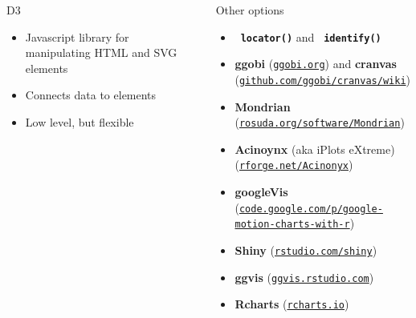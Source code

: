 \documentclass[final,plain]{beamer}
\newlength{\sepwid}
\newlength{\onecolwid}
\newcommand{\bi}{\begin{itemize}}
\newcommand{\ei}{\end{itemize}}
\newcommand{\ttsm}{\tt \small}
\newcommand{\bluebold}{\color{dblue} \bf}
\newcommand{\colonevsep}{\vspace{16mm}}
\begin{document}
\begin{frame}[t]
\begin{columns}[t]
\begin{column}{\onecolwid}
  \colonevsep %

    \begin{block}{D3}{

       \bi \itemsep18pt
       \item Javascript library for manipulating HTML and SVG elements
       \item Connects data to elements
       \item Low level, but flexible
       \ei
    }
    \end{block}

  \end{column}

  \begin{column}{\sepwid} \end{column} %

  \begin{column}{\onecolwid}

    \begin{block}{Other options}{

      \bi \itemsep18pt
      \item {\tt \bluebold locator()} and {\tt \bluebold identify()}
      \item {\bluebold ggobi} {\small (\href{http://ggobi.org}{\ttsm ggobi.org})} and
        {\bluebold cranvas}
        {\small (\href{https://github.com/ggobi/cranvas/wiki}{\ttsm github.com/ggobi/cranvas/wiki})}
      \item {\bluebold Mondrian}
        {\small (\href{http://rosuda.org/software/Mondrian/}{\ttsm rosuda.org/software/Mondrian})}
      \item {\bluebold Acinoynx} (aka iPlots eXtreme)
        {\small (\href{http://rforge.net/Acinonyx/}{\ttsm rforge.net/Acinonyx})}
      \item {\bluebold googleVis}
        {\small (\href{https://code.google.com/p/google-motion-charts-with-r/}{\ttsm code.google.com/p/google-motion-charts-with-r})}
      \item {\bluebold Shiny}
        {\small (\href{http://www.rstudio.com/shiny}{\ttsm rstudio.com/shiny})}
      \item {\bluebold ggvis}
        {\small (\href{http://ggvis.rstudio.com}{\ttsm ggvis.rstudio.com})}
      \item {\bluebold Rcharts}
        {\small (\href{http://rcharts.io}{\ttsm rcharts.io})}
      \ei

    }

    \end{block}


\end{column}
\end{columns}
\end{frame}
\end{document}

